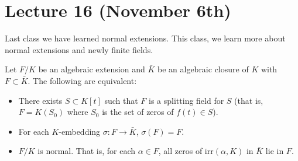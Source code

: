 \section{Lecture 16 (November 6th)}
\begin{rmk}
Last class we have learned normal extensions. This class, we learn more about normal extensions and newly finite fields.
\end{rmk}
\vspace{2ex}
\begin{thm}
Let $F/K$ be an algebraic extension and $\bar{K}$ be an algebraic closure of $K$ with $F\subset \bar{K}$. The following are equivalent:
\begin{itemize}
\item[(i)] There exists $S\subset K[t]$ such that $F$ is a splitting field for $S$ (that is, $F=K(S_0)$ where $S_0$ is the set of zeros of $f(t)\in S$).
\item[(ii)] For each $K$-embedding $\sigma :F\rightarrow \bar{K}$, $\sigma (F)=F$.
\item[(iii)] $F/K$ is normal. That is, for each $\alpha \in F$, all zeros of $\mathrm{irr}(\alpha ,K)$ in $\bar{K}$ lie in $F$. 
\end{itemize}
\end{thm}
\vspace{2ex}
